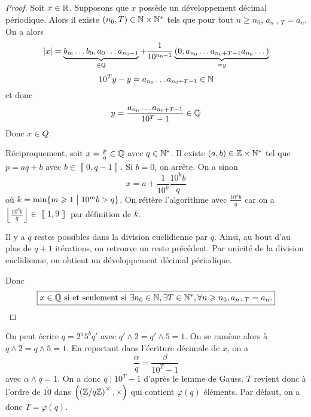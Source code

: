 \begin{proof}
	Soit $x\in\mathbb{R}$. Supposons que $x$ possède un développement décimal périodique. Alors il existe $(n_{0},T)\in\mathbb{N}\times\mathbb{N}^{*}$ tels que pour tout $n\geqslant n_{0}$, $a_{n+T}=a_{n}$. On a alors 
	\begin{equation}
		\vert x\vert=\underbrace{b_{m}\dots b_{0},a_{0}\dots a_{n_{0}-1}}_{\in\mathbb{Q}}+\frac{1}{10^{n_{0}-1}}\underbrace{(0,a_{n_{0}}\dots a_{n_{0}+T-1}a_{n_{0}}\dots)}_{=y}
	\end{equation}
	\begin{equation}
		10^{T}y-y=a_{n_{0}}\dots a_{n_{0}+T-1}\in\mathbb{N}
	\end{equation}
	et donc 
	\begin{equation}
		y=\frac{a_{n_{0}}\dots a_{n_{0}+T-1}}{10^{T}-1}\in\mathbb{Q}
	\end{equation}
	Donc $x\in Q$.

	Réciproquement, soit $x=\frac{p}{q}\in\mathbb{Q}$ avec $q\in\mathbb{N}^{*}$. Il existe $(a,b)\in\mathbb{Z}\times\mathbb{N}^{*}$ tel que $p=aq+b$ avec $b\in\left\llbracket 0,q-1\right\rrbracket$. Si $b=0$, on arrête. On a sinon 
	\begin{equation}
		x=a+\frac{1}{10^{k}}\frac{10^{k}b}{q}
	\end{equation}
	où $k=\min\{m\geqslant1\bigm| 10^{m}b>q\}$.
	On réitère l'algorithme avec $\frac{10^{k}b}{q}$ car on a $\left\lfloor\frac{10^{k}b}{q}\right\rfloor\in\left\llbracket 1,9\right\rrbracket$ par définition de $k$.

	Il y a $q$ restes possibles dans la division euclidienne par $q$. Ainsi, au bout d'au plus de $q+1$ itérations, on retrouve un reste précédent. Par unicité de la division euclidienne, on obtient un développement décimal périodique.

	Donc 
	\begin{equation}
		\boxed{x\in\mathbb{Q}\text{ si et seulement si }\exists n_{0}\in\mathbb{N},\exists T\in\mathbb{N}^{*},\forall n\geqslant n_{0},a_{n+T}=a_{n}.}
	\end{equation}
\end{proof}

\begin{remark}
	On peut écrire $q=2^{a}5^{b}q'$ avec $q'\wedge 2=q'\wedge 5=1$. On se ramène alors à $q\wedge2=q\wedge5=1$. En reportant dans l'écriture décimale de $x$, on a 
	\begin{equation}
		\frac{\alpha}{q}=\frac{\beta}{10^{T}-1}
	\end{equation}
	avec $\alpha\wedge q=1$. On a donc $q\mid 10^{T}-1$ d'après le lemme de Gauss. $T$ revient donc à l'ordre de $\overline{10}$ dans $\left(\left(\mathbb{Z}/q\mathbb{Z}\right)^{\times},\times\right)$ qui contient $\varphi(q)$ éléments. Par défaut, on a donc $T=\varphi(q)$.
\end{remark}

